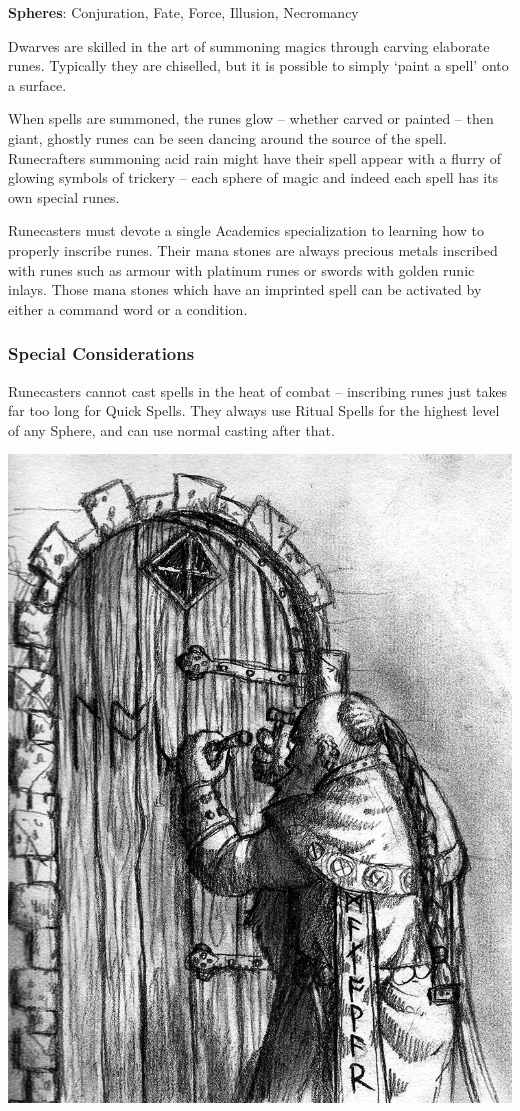 \begin{multicols}{2}
\textbf{Spheres}: Conjuration, Fate, Force, Illusion, Necromancy

\noindent Dwarves are skilled in the art of summoning magics through carving elaborate runes. Typically they are chiselled, but it is possible to simply `paint a spell' onto a surface.

When spells are summoned, the runes glow -- whether carved or painted -- then giant, ghostly runes can be seen dancing around the source of the spell.
Runecrafters summoning acid rain might have their spell appear with a flurry of glowing symbols of trickery -- each sphere of magic and indeed each spell has its own special runes.

Runecasters must devote a single Academics specialization to learning how to properly inscribe runes.
Their mana stones are always precious metals inscribed with runes such as armour with platinum runes or swords with golden runic inlays.
Those mana stones which have an imprinted spell can be activated by either a command word or a condition.

\subsubsection{Special Considerations}

Runecasters cannot cast spells in the heat of combat -- inscribing runes just takes far too long for Quick Spells. They always use Ritual Spells for the highest level of any Sphere, and can use normal casting after that.

	\noindent\includegraphics[width=\linewidth]{images/Roch_Hercka/dwarvish_runes.jpg}
	\label{roch:runes}


\end{multicols}
